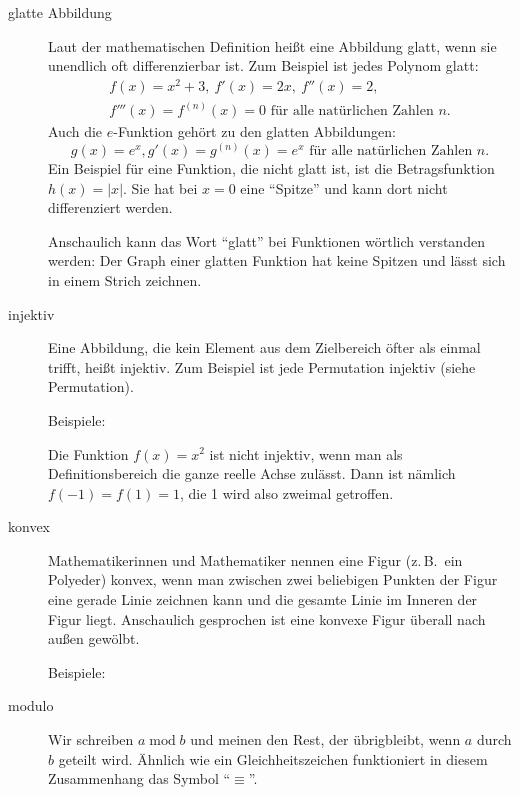 \begin{description}
	\item[glatte Abbildung] Laut der mathematischen Definition heißt eine Abbildung glatt, wenn sie unendlich oft differenzierbar ist. 
		Zum \nopagebreak Beispiel ist jedes Polynom glatt: 
		\begin{gather*}
			f(x) = x^2 + 3,\ f'(x) = 2x,\ f''(x) = 2,\\
			f'''(x) = f^{(n)}(x) = 0 \text{ für alle natürlichen Zahlen } n.
		\end{gather*}
		Auch die $e$-Funktion gehört zu den glatten Abbildungen: 
		\begin{equation*}
			g(x) = e^x, g'(x) = g^{(n)}(x) = e^x \text{ für alle natürlichen Zahlen } n.
		\end{equation*}
		Ein Beispiel für eine Funktion, die nicht glatt ist, ist die Betragsfunktion $h(x) = |x|.$ Sie hat bei $x=0$ eine \enquote{Spitze} und kann dort nicht differenziert werden. 

		Anschaulich kann das Wort \enquote{glatt} bei Funktionen wörtlich verstanden werden: Der Graph einer glatten Funktion hat keine Spitzen und lässt sich in einem Strich zeichnen. 

	\item[injektiv] Eine Abbildung, die kein Element aus dem Zielbereich öfter als einmal trifft, heißt injektiv. Zum Beispiel ist jede Permutation injektiv (siehe Permutation). 

		Beispiele: 
		\begin{figure}[H] 
			\centering 
			\def\svgwidth{200pt} 
			 
		\end{figure}
		Die Funktion $f(x) = x^2$ ist nicht injektiv, wenn man als Definitionsbereich die ganze reelle Achse zulässt. Dann ist nämlich $f(-1) = f(1) = 1$, die 1 wird also zweimal getroffen. 

	\item[konvex] Mathematikerinnen und Mathematiker nennen eine Figur (z.\,B.\ ein Polyeder) konvex, wenn man zwischen zwei beliebigen Punkten der Figur eine gerade Linie zeichnen kann und die gesamte Linie im Inneren der Figur liegt. 
		Anschaulich gesprochen ist eine konvexe Figur überall nach außen gewölbt. 

		Beispiele: 
		\begin{figure}[H] 
			\centering 
			\def\svgwidth{270pt} 
			 
		\end{figure} 
	\item[modulo] Wir schreiben $a \operatorname{mod} b$ und meinen den Rest, der übrigbleibt, wenn $a$ durch $b$ geteilt wird. 
		Ähnlich wie ein Gleichheitszeichen funktioniert in diesem Zusammenhang das Symbol \enquote{$\equiv$}. 


\end{description}
